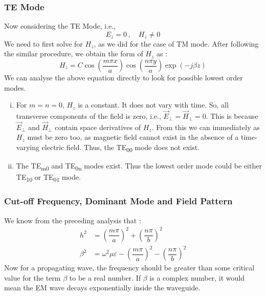 \documentclass[12pt]{article}
\begin{document}
\subsubsection{TE Mode} %
Now considering the TE Mode, i.e.,
\begin{equation*}
  E_z=0 \, , \quad H_z \neq 0
\end{equation*}
We need to first solve for $H_z$, as we did for the case of TM mode. \linebreak
After following the similar procedure, we obtain the form of $H_z$ as :
\begin{equation}
  H_z = C \cos\left( \dfrac{m\pi x}{a} \right)\cos\left( \dfrac{n\pi y}{a} \right) \exp(-j\beta z) \label{eq:19}
\end{equation}
We can analyse the above equation directly to look for possible lowest order modes.
\begin{enumerate}[i.)]
  \item For $m=n=0$, $H_z$ is a constant. It does not vary with time. So, all transverse components of the field is zero, i.e., $\vec{E}_{\perp}=\vec{H}_{\perp}=0$. This is because $\vec{E}_{\perp}$ and $\vec{H}_{\perp}$ contain space derivatives of $H_z$. From this we can immediately as $H_z$ must be zero too, as magnetic field cannot exist in the absence of a time-varying electric field. Thus, the TE\textsubscript{00} mode does not exist. 
  \item The TE\textsubscript{m0} and TE\textsubscript{0n} modes exist. Thus the lowest order mode could be either TE\textsubscript{10} or TE\textsubscript{01} mode.
\end{enumerate}
\subsubsection{Cut-off Frequency, Dominant Mode and Field Pattern}
We know from the preceding analysis that :
\begin{align*}
  h^2 &= \left( \dfrac{m\pi}{a} \right)^2 + \left( \dfrac{n \pi}{b} \right)^2 \\
  \beta^2 &= \omega^2 \mu \varepsilon - \left( \dfrac{m\pi}{a} \right)^2 - \left( \dfrac{n \pi}{b} \right)^2
\end{align*}
Now for a propagating wave, the frequency should be greater than some critical value for the term $\beta$ to be a real number. If $\beta$ is a complex number, it would mean the EM wave decays exponentially inside the waveguide. \linebreak
\end{document}
